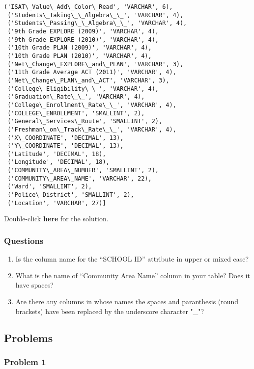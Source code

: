 \documentclass[11pt]{article}
\providecommand{\tightlist}{%
      \setlength{\itemsep}{0pt}\setlength{\parskip}{0pt}}
\begin{document}
\begin{tcolorbox}[breakable, size=fbox, boxrule=.5pt, pad at break*=1mm, opacityfill=0]
\begin{Verbatim}[commandchars=\\\{\}]
 ('ISAT\_Value\_Add\_Color\_Read', 'VARCHAR', 6),
 ('Students\_Taking\_\_Algebra\_\_', 'VARCHAR', 4),
 ('Students\_Passing\_\_Algebra\_\_', 'VARCHAR', 4),
 ('9th Grade EXPLORE (2009)', 'VARCHAR', 4),
 ('9th Grade EXPLORE (2010)', 'VARCHAR', 4),
 ('10th Grade PLAN (2009)', 'VARCHAR', 4),
 ('10th Grade PLAN (2010)', 'VARCHAR', 4),
 ('Net\_Change\_EXPLORE\_and\_PLAN', 'VARCHAR', 3),
 ('11th Grade Average ACT (2011)', 'VARCHAR', 4),
 ('Net\_Change\_PLAN\_and\_ACT', 'VARCHAR', 3),
 ('College\_Eligibility\_\_', 'VARCHAR', 4),
 ('Graduation\_Rate\_\_', 'VARCHAR', 4),
 ('College\_Enrollment\_Rate\_\_', 'VARCHAR', 4),
 ('COLLEGE\_ENROLLMENT', 'SMALLINT', 2),
 ('General\_Services\_Route', 'SMALLINT', 2),
 ('Freshman\_on\_Track\_Rate\_\_', 'VARCHAR', 4),
 ('X\_COORDINATE', 'DECIMAL', 13),
 ('Y\_COORDINATE', 'DECIMAL', 13),
 ('Latitude', 'DECIMAL', 18),
 ('Longitude', 'DECIMAL', 18),
 ('COMMUNITY\_AREA\_NUMBER', 'SMALLINT', 2),
 ('COMMUNITY\_AREA\_NAME', 'VARCHAR', 22),
 ('Ward', 'SMALLINT', 2),
 ('Police\_District', 'SMALLINT', 2),
 ('Location', 'VARCHAR', 27)]
\end{Verbatim}
\end{tcolorbox}
        
    Double-click \textbf{here} for the solution.

    \hypertarget{questions}{%
\subsubsection{Questions}\label{questions}}

\begin{enumerate}
\def\labelenumi{\arabic{enumi}.}
\tightlist
\item
  Is the column name for the ``SCHOOL ID'' attribute in upper or mixed
  case?
\item
  What is the name of ``Community Area Name'' column in your table? Does
  it have spaces?
\item
  Are there any columns in whose names the spaces and paranthesis (round
  brackets) have been replaced by the underscore character "\_"?
\end{enumerate}

    \hypertarget{problems}{%
\subsection{Problems}\label{problems}}

\hypertarget{problem-1}{%
\subsubsection{Problem 1}\label{problem-1}}
\end{document}
